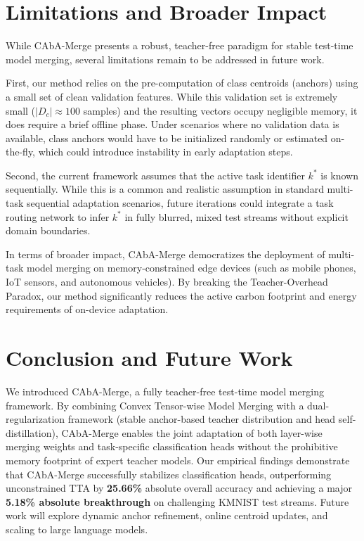 \documentclass{article}
\theoremstyle{plain}
\theoremstyle{definition}
\theoremstyle{remark}
\begin{document}
\section{Limitations and Broader Impact}
\label{sec:limitations}
While CAbA-Merge presents a robust, teacher-free paradigm for stable test-time model merging, several limitations remain to be addressed in future work.

First, our method relies on the pre-computation of class centroids (anchors) using a small set of clean validation features. While this validation set is extremely small ($|D_c| \approx 100$ samples) and the resulting vectors occupy negligible memory, it does require a brief offline phase. Under scenarios where no validation data is available, class anchors would have to be initialized randomly or estimated on-the-fly, which could introduce instability in early adaptation steps.

Second, the current framework assumes that the active task identifier $k^*$ is known sequentially. While this is a common and realistic assumption in standard multi-task sequential adaptation scenarios, future iterations could integrate a task routing network to infer $k^*$ in fully blurred, mixed test streams without explicit domain boundaries.

In terms of broader impact, CAbA-Merge democratizes the deployment of multi-task model merging on memory-constrained edge devices (such as mobile phones, IoT sensors, and autonomous vehicles). By breaking the Teacher-Overhead Paradox, our method significantly reduces the active carbon footprint and energy requirements of on-device adaptation.

\section{Conclusion and Future Work}
\label{sec:conclusion}
We introduced CAbA-Merge, a fully teacher-free test-time model merging framework. By combining Convex Tensor-wise Model Merging with a dual-regularization framework (stable anchor-based teacher distribution and head self-distillation), CAbA-Merge enables the joint adaptation of both layer-wise merging weights and task-specific classification heads without the prohibitive memory footprint of expert teacher models. Our empirical findings demonstrate that CAbA-Merge successfully stabilizes classification heads, outperforming unconstrained TTA by \textbf{25.66\%} absolute overall accuracy and achieving a major \textbf{5.18\% absolute breakthrough} on challenging KMNIST test streams. Future work will explore dynamic anchor refinement, online centroid updates, and scaling to large language models.



\end{document}

